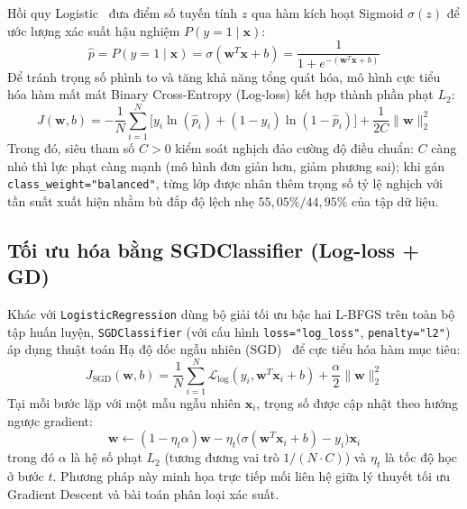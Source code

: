 \documentclass[12pt,a4paper,oneside]{report}
\begin{document}
Hồi quy Logistic~\cite{cox1958} đưa điểm số tuyến tính $z$ qua hàm kích hoạt Sigmoid $\sigma(z)$ để ước lượng xác suất hậu nghiệm $P(y=1 \mid \mathbf{x})$:
\begin{equation}
  \hat{p} = P(y=1 \mid \mathbf{x}) = \sigma(\mathbf{w}^T \mathbf{x} + b) = \frac{1}{1 + e^{-(\mathbf{w}^T \mathbf{x} + b)}}
  \label{eq:sigmoid}
\end{equation}
Để tránh trọng số phình to và tăng khả năng tổng quát hóa, mô hình cực tiểu hóa hàm mất mát Binary Cross-Entropy (Log-loss) kết hợp thành phần phạt $L_2$:
\begin{equation}
  J(\mathbf{w}, b) = -\frac{1}{N}\sum_{i=1}^{N} \Big[ y_i \ln(\hat{p}_i) + (1 - y_i)\ln(1 - \hat{p}_i) \Big] + \frac{1}{2C}\|\mathbf{w}\|_2^2
  \label{eq:logreg_loss}
\end{equation}
Trong đó, siêu tham số $C > 0$ kiểm soát nghịch đảo cường độ điều chuẩn: $C$ càng nhỏ thì lực phạt càng mạnh (mô hình đơn giản hơn, giảm phương sai); khi gán \texttt{class\_weight="balanced"}, từng lớp được nhân thêm trọng số tỷ lệ nghịch với tần suất xuất hiện nhằm bù đắp độ lệch nhẹ $55{,}05\% / 44{,}95\%$ của tập dữ liệu.

\subsection{Tối ưu hóa bằng SGDClassifier (Log-loss + GD)}

Khác với \texttt{LogisticRegression} dùng bộ giải tối ưu bậc hai L-BFGS trên toàn bộ tập huấn luyện, \texttt{SGDClassifier} (với cấu hình \texttt{loss="log\_loss"}, \texttt{penalty="l2"}) áp dụng thuật toán Hạ độ dốc ngẫu nhiên (SGD)~\cite{bottou2010} để cực tiểu hóa hàm mục tiêu:
\begin{equation}
  J_{\text{SGD}}(\mathbf{w}, b) = \frac{1}{N}\sum_{i=1}^{N} \mathcal{L}_{\text{log}}(y_i, \mathbf{w}^T \mathbf{x}_i + b) + \frac{\alpha}{2}\|\mathbf{w}\|_2^2
  \label{eq:sgd_loss}
\end{equation}
Tại mỗi bước lặp với một mẫu ngẫu nhiên $\mathbf{x}_i$, trọng số được cập nhật theo hướng ngược gradient:
\begin{equation}
  \mathbf{w} \leftarrow (1 - \eta_t \alpha)\mathbf{w} - \eta_t \big(\sigma(\mathbf{w}^T \mathbf{x}_i + b) - y_i\big)\mathbf{x}_i
  \label{eq:sgd_update}
\end{equation}
trong đó $\alpha$ là hệ số phạt $L_2$ (tương đương vai trò $1/(N \cdot C)$) và $\eta_t$ là tốc độ học ở bước $t$. Phương pháp này minh họa trực tiếp mối liên hệ giữa lý thuyết tối ưu Gradient Descent và bài toán phân loại xác suất.
\end{document}
